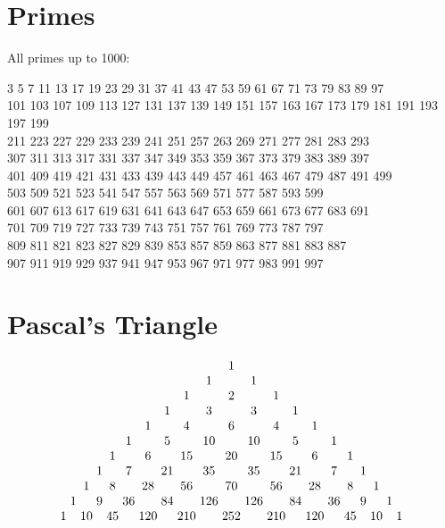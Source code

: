 \documentclass[10pt]{book}
\begin{document}
\section{Primes}

All primes up to 1000: \medskip

 3 5 7 11 13 17 19 23 29 31 37 41 43 47 53 59 61 67 71 73
79 83 89 97 \\ 101 103 107 109 113 127 131 137 139 149 151 157 163 167
173 179 181 191 193 197 199 \\ 211 223 227 229 233 239 241 251 257 263
269 271 277 281 283 293 \\ 307 311 313 317 331 337 347 349 353 359 367
373 379 383 389 397 \\ 401 409 419 421 431 433 439 443 449 457 461 463
467 479 487 491 499 \\ 503 509 521 523 541 547 557 563 569 571 577 587
593 599 \\ 601 607 613 617 619 631 641 643 647 653 659 661 673 677 683
691 \\ 701 709 719 727 733 739 743 751 757 761 769 773 787 797 \\ 809 811
821 823 827 829 839 853 857 859 863 877 881 883 887 \\ 907 911 919 929
937 941 947 953 967 971 977 983 991 997

\section{Pascal's Triangle}
\label{sec:pascal}

\[
  \arraycolsep=1.5pt
  \begin{array}{ccccccccccccccccccccc}
    & &  & &  &  &   &  &   &   &1  &   &   &  &   &  &  & &  & & \\
    & &  & &  &  &   &  &   &1  &   &1  &   &  &   &  &  & &  & & \\
    & &  & &  &  &   &  &1  &   &2  &   &1  &  &   &  &  & &  & & \\
    & &  & &  &  &   &1 &   &3  &   &3  &   &1 &   &  &  & &  & & \\
    & &  & &  &  &1  &  &4  &   &6  &   &4  &  &1  &  &  & &  & & \\
    & &  & &  &1 &   &5 &   &10 &   &10 &   &5 &   &1 &  & &  & & \\
    & &  & &1 &  &6  &  &15 &   &20 &   &15 &  &6  &  &1 & &  & & \\
    & &  &1&  &7 &   &21&   &35 &   &35 &   &21&   &7 &  &1&  & & \\
    & &1 & &8 &  &28 &  &56 &   &70 &   &56 &  &28 &  &8 & &1 & & \\
    &1&  &9&  &36&   &84&   &126&   &126&   &84&   &36&  &9&  &1& \\
   1& &10& &45&  &120&  &210&   &252&   &210&  &120&  &45& &10& &1
  \end{array}
\]
\end{document}
